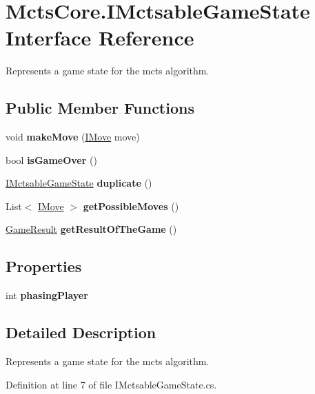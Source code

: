 \hypertarget{interface_mcts_core_1_1_i_mctsable_game_state}{}\section{Mcts\+Core.\+I\+Mctsable\+Game\+State Interface Reference}
\label{interface_mcts_core_1_1_i_mctsable_game_state}


Represents a game state for the mcts algorithm.  


\subsection*{Public Member Functions}
\begin{DoxyCompactItemize}
\item 
\mbox{\label{interface_mcts_core_1_1_i_mctsable_game_state_a56d2cadef7e60b1c334b9c10c20b6d18}} 
void {\bfseries make\+Move} (\mbox{\hyperlink{interface_mcts_core_1_1_i_move}{I\+Move}} move)
\item 
\mbox{\label{interface_mcts_core_1_1_i_mctsable_game_state_aec80aafd8592e5f686b3c6ea2b4e1190}} 
bool {\bfseries is\+Game\+Over} ()
\item 
\mbox{\label{interface_mcts_core_1_1_i_mctsable_game_state_a0a8f5d003e52adb2af90878067f8838f}} 
\mbox{\hyperlink{interface_mcts_core_1_1_i_mctsable_game_state}{I\+Mctsable\+Game\+State}} {\bfseries duplicate} ()
\item 
\mbox{\label{interface_mcts_core_1_1_i_mctsable_game_state_aaec4b1d3947fc0a15f9cee09d8916425}} 
List$<$ \mbox{\hyperlink{interface_mcts_core_1_1_i_move}{I\+Move}} $>$ {\bfseries get\+Possible\+Moves} ()
\item 
\mbox{\label{interface_mcts_core_1_1_i_mctsable_game_state_ac3466b8f70e507775f3f5a946ca4fbc5}} 
\mbox{\hyperlink{class_mcts_core_1_1_game_result}{Game\+Result}} {\bfseries get\+Result\+Of\+The\+Game} ()
\end{DoxyCompactItemize}
\subsection*{Properties}
\begin{DoxyCompactItemize}
\item 
\mbox{\label{interface_mcts_core_1_1_i_mctsable_game_state_af6f55eec4b0c1b18ee5f19951d605964}} 
int {\bfseries phasing\+Player}
\end{DoxyCompactItemize}


\subsection{Detailed Description}
Represents a game state for the mcts algorithm. 



Definition at line 7 of file I\+Mctsable\+Game\+State.\+cs.

